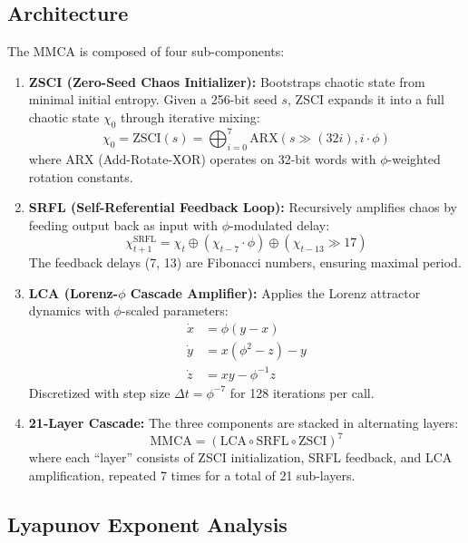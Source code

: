 \documentclass[11pt,a4paper]{article}
\begin{document}
\subsection{Architecture}

The MMCA is composed of four sub-components:

\begin{enumerate}[leftmargin=*,itemsep=2pt]
    \item \textbf{ZSCI (Zero-Seed Chaos Initializer):} Bootstraps chaotic state from minimal initial entropy. Given a 256-bit seed $s$, ZSCI expands it into a full chaotic state $\chi_0$ through iterative mixing:
    \[
    \chi_0 = \text{ZSCI}(s) = \bigoplus_{i=0}^{7} \text{ARX}(s \gg (32i), i \cdot \phi)
    \]
    where ARX (Add-Rotate-XOR) operates on 32-bit words with $\phi$-weighted rotation constants.
    
    \item \textbf{SRFL (Self-Referential Feedback Loop):} Recursively amplifies chaos by feeding output back as input with $\phi$-modulated delay:
    \[
    \chi_{t+1}^{\text{SRFL}} = \chi_t \oplus (\chi_{t-7} \cdot \phi) \oplus (\chi_{t-13} \gg 17)
    \]
    The feedback delays (7, 13) are Fibonacci numbers, ensuring maximal period.
    
    \item \textbf{LCA (Lorenz-$\phi$ Cascade Amplifier):} Applies the Lorenz attractor dynamics with $\phi$-scaled parameters:
    \begin{align*}
    \dot{x} &= \phi(y - x) \\
    \dot{y} &= x(\phi^2 - z) - y \\
    \dot{z} &= xy - \phi^{-1}z
    \end{align*}
    Discretized with step size $\Delta t = \phi^{-7}$ for 128 iterations per call.
    
    \item \textbf{21-Layer Cascade:} The three components are stacked in alternating layers:
    \[
    \text{MMCA} = (\text{LCA} \circ \text{SRFL} \circ \text{ZSCI})^{7}
    \]
    where each ``layer'' consists of ZSCI initialization, SRFL feedback, and LCA amplification, repeated 7 times for a total of 21 sub-layers.
\end{enumerate}

\subsection{Lyapunov Exponent Analysis}
\end{document}
